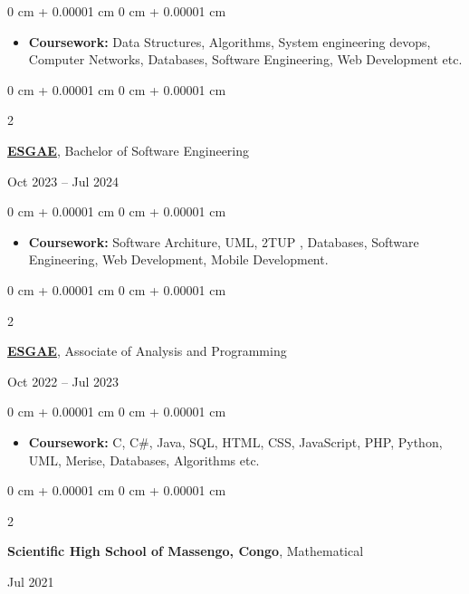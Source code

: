 \documentclass[10pt, letterpaper]{article}
\newenvironment{highlights}{
  \begin{itemize}[
    topsep=0.10 cm,
    parsep=0.10 cm,
    partopsep=0pt,
    itemsep=0pt,
    leftmargin=0 cm + 10pt
  ]
}{
  \end{itemize}
} %
\newenvironment{onecolentry}{
  \begin{adjustwidth}{
    0 cm + 0.00001 cm
  }{
    0 cm + 0.00001 cm
  }
}{
  \end{adjustwidth}
} %
\newenvironment{twocolentry}[2][]{
  \onecolentry
    \def\secondColumn{#2}
  \setcolumnwidth{\fill, 4.5 cm}
  \begin{paracol}{2}
}{
  \switchcolumn \raggedleft \secondColumn
    \end{paracol}
  \endonecolentry
} %
\begin{document}
\vspace{0.10 cm}
\begin{onecolentry}

\begin{highlights}
\item \textbf{Coursework:} Data Structures, Algorithms,
  System engineering devops, Computer Networks, Databases,
  Software Engineering, Web Development etc.
\end{highlights}

\end{onecolentry}

  \begin{twocolentry}{
    Oct 2023 – Jul 2024
  }
\textbf{\href{https://esgae.org/}{ESGAE}}, Bachelor of Software Engineering

\end{twocolentry}

\vspace{0.10 cm}
\begin{onecolentry}

\begin{highlights}
\item \textbf{Coursework:} Software Architure, UML, 2TUP , Databases,
  Software Engineering, Web Development, Mobile Development.
\end{highlights}

\end{onecolentry}

  \begin{twocolentry}{
    Oct 2022 – Jul 2023
  }
\textbf{\href{https://esgae.org/}{ESGAE}}, Associate of Analysis and Programming

\end{twocolentry}

\vspace{0.10 cm}
\begin{onecolentry}
\begin{highlights}
\item \textbf{Coursework:} C, C\#, Java, SQL, HTML, CSS,
  JavaScript, PHP, Python, UML, Merise, Databases, Algorithms etc.
  \end{highlights}
  \end{onecolentry}

  \begin{twocolentry}{
    Jul 2021
  }
\textbf{Scientific High School of Massengo, Congo}, Mathematical

\end{twocolentry}
\end{document}
